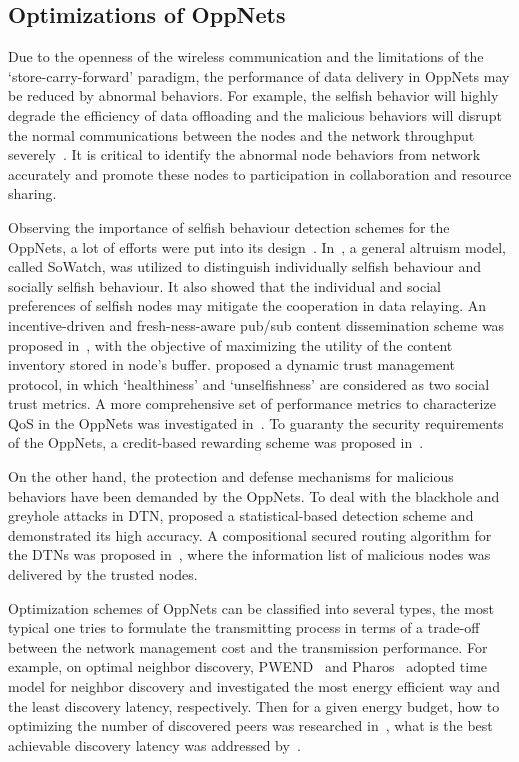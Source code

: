 \subsection{Optimizations of OppNets}
Due to the openness of
the wireless communication and the limitations of the
`store-carry-forward' paradigm,
the performance of data delivery in OppNets may be reduced
by abnormal behaviors.
For example,
the selfish behavior will highly degrade
the efficiency of data offloading
and the malicious behaviors
will disrupt the
normal communications between the nodes and the network
throughput severely~\cite{DBLP:journals/comsur/JedariXN18}.
It is critical to
identify the abnormal node behaviors from
network accurately and promote these nodes to
participation in collaboration and resource sharing.

Observing the importance of selfish behaviour detection
schemes for the OppNets,
a lot of efforts were
put into its design~\cite{DBLP:journals/fgcs/JedariXCDTA19, Zhou2015Incentive, Chen2014Dynamic, DBLP:journals/tdsc/ChoC18, Wang2016A}.
In~\cite{DBLP:journals/fgcs/JedariXCDTA19},
a general altruism model,
called SoWatch,
was utilized to 
distinguish individually selfish behaviour and socially selfish behaviour.
It also showed that the individual and social preferences of selfish nodes
may mitigate the cooperation in data relaying.
An incentive-driven and fresh-ness-aware pub/sub content dissemination scheme
was proposed in~\cite{Zhou2015Incentive},
with the objective of maximizing the utility of the content inventory stored in node's buffer.
\cite{Chen2014Dynamic} proposed a dynamic trust management protocol,
in which `healthiness' and
`unselfishness' are considered as two social trust metrics. 
A more comprehensive set of performance metrics to characterize QoS in the OppNets
was investigated in~\cite{DBLP:journals/tdsc/ChoC18}.
To guaranty the security requirements of the OppNets,
a credit-based
rewarding scheme was proposed in~\cite{Wang2016A}.

On the other hand, 
the protection and defense mechanisms for malicious behaviors have
been demanded by the OppNets.
To deal with the blackhole and greyhole attacks
in DTN,
\cite{Pham2016Detecting} proposed a statistical-based detection scheme and
demonstrated its high accuracy. 
A compositional secured routing algorithm for the DTNs
was proposed in~\cite{Saha2018Design},
where the information list of malicious nodes was delivered by the trusted nodes.


Optimization schemes of OppNets can be classified into
several types, the most typical one tries to formulate
the transmitting process in terms of a trade-off between
the network management cost and the transmission performance.
For example, on optimal neighbor discovery,
PWEND~\cite{DBLP:journals/adhoc/ChenQLLWYL20} and
Pharos~\cite{DBLP:conf/secon/Zhu00L19} adopted time model
for neighbor discovery and investigated the most energy efficient way
and the least discovery latency, respectively.
Then for a given energy budget,
how to optimizing the number of discovered peers was researched
in~\cite{DBLP:journals/tmc/LoretiB20},
what is the best achievable discovery latency was addressed
by~\cite{DBLP:conf/sigcomm/KindtC19}.

